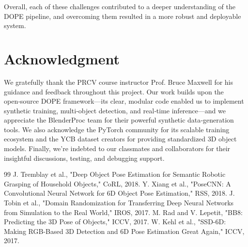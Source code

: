 \documentclass[conference]{IEEEtran}
\begin{document}
Overall, each of these challenges contributed to a deeper understanding of the DOPE pipeline, and overcoming them resulted in a more robust and deployable system.

\section{Acknowledgment}

We gratefully thank the PRCV course instructor Prof. Bruce Maxwell for his guidance and feedback throughout this project. Our work builds upon the open‑source DOPE framework—its clear, modular code enabled us to implement synthetic training, multi‑object detection, and real‑time inference—and we appreciate the BlenderProc team for their powerful synthetic data‑generation tools. We also acknowledge the PyTorch community for its scalable training ecosystem and the YCB dataset creators for providing standardized 3D object models. Finally, we’re indebted to our classmates and collaborators for their insightful discussions, testing, and debugging support.


\begin{thebibliography}{99}
 J. Tremblay et al., "Deep Object Pose Estimation for Semantic Robotic Grasping of Household Objects," CoRL, 2018.
 Y. Xiang et al., "PoseCNN: A Convolutional Neural Network for 6D Object Pose Estimation," RSS, 2018.
 J. Tobin et al., "Domain Randomization for Transferring Deep Neural Networks from Simulation to the Real World," IROS, 2017.
 M. Rad and V. Lepetit, "BB8: Predicting the 3D Pose of Objects," ICCV, 2017.
 W. Kehl et al., "SSD-6D: Making RGB-Based 3D Detection and 6D Pose Estimation Great Again," ICCV, 2017.
\end{thebibliography}
\end{document}
